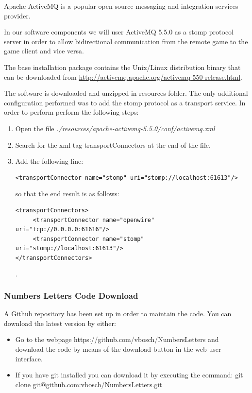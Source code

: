 \documentclass[a4paper,10pt,titlepage]{article}
\begin{document}
\par Apache ActiveMQ is a popular open source messaging and integration services provider.

\par In our software components we will user ActiveMQ 5.5.0 as a stomp protocol server in order to allow bidirectional communication from the remote game to the game client and vice versa.

\par The base installation package contains the Unix/Linux distribution binary that can be downloaded from \url{http://activemq.apache.org/activemq-550-release.html}.

\par The software is downloaded and unzipped in resources folder. The only additional configuration performed was to add the stomp protocol as a transport service. In order to perform perform the following steps:
\begin{enumerate}
	\item Open the file \textit{./resources/apache-activemq-5.5.0/conf/activemq.xml}
	\item Search for the xml tag transportConnectors at the end of the file.
	\item Add the following line: \begin{verbatim}<transportConnector name="stomp" uri="stomp://localhost:61613"/> \end{verbatim} so that the end result is as follows:
\begin{verbatim}
<transportConnectors>
     <transportConnector name="openwire" uri="tcp://0.0.0.0:61616"/>
     <transportConnector name="stomp" uri="stomp://localhost:61613"/>
</transportConnectors>
\end{verbatim}. 
\end{enumerate}

\subsubsection{Numbers Letters Code Download}

A Github repository has been set up in order to maintain the code. You can download the latest version by either:
\begin{itemize}
	\item Go to the webpage https://github.com/vbosch/NumbersLetters and download the code by means of the download button in the web user interface. 
	\item If you have git installed you can download it by executing the command: git clone git@github.com:vbosch/NumbersLetters.git
\end{itemize}
\end{document}
